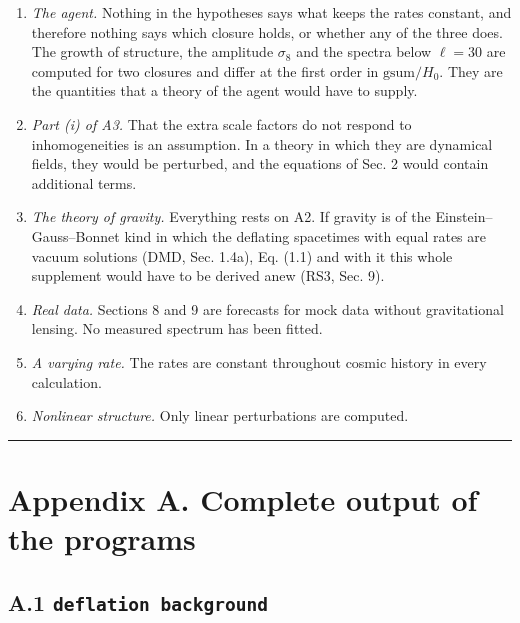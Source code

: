 \documentclass[
  10pt,
]{article}
\providecommand{\tightlist}{%
  \setlength{\itemsep}{0pt}\setlength{\parskip}{0pt}}
\begin{document}
\begin{enumerate}
\def\labelenumi{\arabic{enumi}.}
\tightlist
\item
  \emph{The agent.} Nothing in the hypotheses says what keeps the rates
  constant, and therefore nothing says which closure holds, or whether
  any of the three does. The growth of structure, the amplitude
  \(\sigma_8\) and the spectra below \(\ell=30\) are computed for two
  closures and differ at the first order in \(\mathrm{gsum}/H_0\). They
  are the quantities that a theory of the agent would have to supply.
\item
  \emph{Part (i) of A3.} That the extra scale factors do not respond to
  inhomogeneities is an assumption. In a theory in which they are
  dynamical fields, they would be perturbed, and the equations of Sec. 2
  would contain additional terms.
\item
  \emph{The theory of gravity.} Everything rests on A2. If gravity is of
  the Einstein--Gauss--Bonnet kind in which the deflating spacetimes
  with equal rates are vacuum solutions (DMD, Sec. 1.4a), Eq. (1.1) and
  with it this whole supplement would have to be derived anew (RS3, Sec.
  9).
\item
  \emph{Real data.} Sections 8 and 9 are forecasts for mock data without
  gravitational lensing. No measured spectrum has been fitted.
\item
  \emph{A varying rate.} The rates are constant throughout cosmic
  history in every calculation.
\item
  \emph{Nonlinear structure.} Only linear perturbations are computed.
\end{enumerate}

\begin{center}\rule{0.5\linewidth}{0.5pt}\end{center}

\hypertarget{appendix-a.-complete-output-of-the-programs}{%
\section{Appendix A. Complete output of the
programs}\label{appendix-a.-complete-output-of-the-programs}}

\hypertarget{a.1-deflation-background}{%
\subsection{\texorpdfstring{A.1
\texttt{deflation\ background}}{A.1 deflation background}}\label{a.1-deflation-background}}
\end{document}
